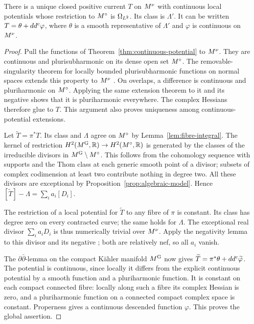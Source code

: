 \begin{theorem}\label{thm:global-current}
There is a unique closed positive current $T$ on $M^{\nu}$ with continuous
local potentials whose restriction to $M^{\circ}$ is $\Omega_{L^2}$. Its class is
$\Lambda'$. It can be written $T=\theta+dd^c\varphi$, where $\theta$ is a
smooth representative of $\Lambda'$ and $\varphi$ is continuous on $M^{\nu}$.
\end{theorem}
\begin{proof}
Pull the functions of Theorem~\ref{thm:continuous-potential} to $M^{\nu}$.
They are continuous and plurisubharmonic on its dense open set $M^{\circ}$.
The removable-singularity theorem for locally bounded plurisubharmonic
functions on normal spaces extends this property to $M^{\nu}$
\cite[S\"atze~3--4]{GR56}.
On overlaps, a difference is continuous and pluriharmonic on $M^{\circ}$.
Applying the same extension theorem to it and its negative shows that it
is pluriharmonic everywhere. The complex Hessians therefore glue to $T$.
This argument also proves uniqueness among continuous-potential extensions.

Let $\widetilde T=\pi^*T$. Its class and $\Lambda$ agree on $M^{\circ}$ by
Lemma~\ref{lem:fibre-integral}. The kernel of restriction
$H^2(M^{\mathrm G},\mathbb R)\to H^2(M^{\circ},\mathbb R)$ is generated by the classes of the
irreducible divisors in $M^{\mathrm G}\setminus M^{\circ}$. This follows from the
cohomology sequence with supports and the Thom class at each generic
smooth point of a divisor; subsets of complex codimension at least two
contribute nothing in degree two. All these divisors are exceptional by
Proposition~\ref{prop:algebraic-model}. Hence
$[\widetilde T]-\Lambda=\sum_i a_i[D_i]$.

The restriction of a local potential for $\widetilde T$ to any fibre of
$\pi$ is constant. Its class has degree zero on every contracted curve;
the same holds for $\Lambda$. The exceptional real divisor
$\sum_i a_iD_i$ is thus numerically trivial over $M^{\nu}$. Apply the negativity
lemma to this divisor and its negative \cite[Lemma~3.39]{KM98}; both are
relatively nef, so all $a_i$ vanish.

The $\partial\bar\partial$-lemma on the compact K\"ahler manifold $M^{\mathrm G}$
now gives $\widetilde T=\pi^*\theta+dd^c\widetilde\varphi$.
The potential is continuous, since locally it differs from the explicit
continuous potential by a smooth function and a pluriharmonic function.
It is constant on each compact connected fibre: locally along such a fibre
its complex Hessian is zero, and a pluriharmonic function on a connected
compact complex space is constant. Properness gives a continuous descended
function $\varphi$. This proves the global assertion.
\end{proof}
